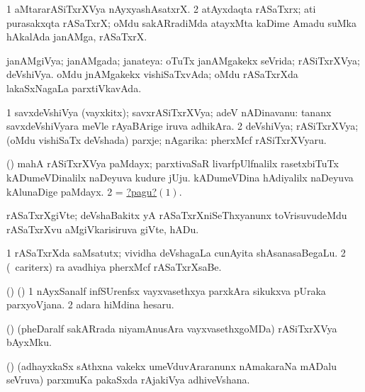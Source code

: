 \noindent
\gl{\pagu}
\bmng
\bnum
\num{1}  aMtararASiTxrXVya nAyxyashAsatxrX. 
\num{2}  atAyxdaqta rASaTxrx; ati purasakxqta rASaTxrX; oMdu sakARradiMda atayxMta kaDime Amadu suMka hAkalAda janAMga, rASaTxrX. 
\enum
\emng
\eentry

\bentry
{}
\gl{\gu}
\bmng
janAMgiVya; janAMgada; janateya: 
\banum
{} oTuTx janAMgakekx seVrida; rASiTxrXVya; deVshiVya. 
 oMdu jnAMgakekx vishiSaTxvAda; oMdu rASaTxrXda lakaSxNagaLa parxtiVkavAda. 
\eanum
\emng
\eentry

\bentry
{}
\gl{\nA}
\bmng
\bnum
\num{1} savxdeVshiVya (vayxkitx); savxrASiTxrXVya; adeV nADinavanu:  tananx savxdeVshiVyara meVle rAyaBArige iruva adhikAra. 
\num{2} deVshiVya; rASiTxrXVya; (oMdu vishiSaTx deVshada) parxje; nAgarika:  pherxMcf rASiTxrXVyaru. 
\enum
\emng

\noindent
\gl{\pagu}
\bmng
\hypertarget{national2pagu1}{} 
\bnum
{}  (\birx) 
\banum
{} mahA rASiTxrXVya paMdayx; parxtivaSaR livarfpUlfnalilx rasetxbiTuTx kADumeVDinalilx naDeyuva kudure jUju. 
 kADumeVDina hAdiyalilx naDeyuva kAlunaDige paMdayx. 
\eanum
\numie
\num{2}  = \hyperlink{national2pagu1}{?pagu?\((1)\)}. 
\enum
\emng
\eentry

\bentry
{}
\gl{\nA}
\bmng
rASaTxrXgiVte; deVshaBakitx yA rASaTxrXniSeThxyanunx toVrisuvudeMdu rASaTxrXvu aMgiVkarisiruva giVte, hADu. 
\emng
\eentry

\bentry
{}
\gl{\nA}
\bmng
\bnum
\num{1} rASaTxrXda saMsatutx; vividha deVshagaLa cunAyita shAsanasaBegaLu. 
\num{2} (\kanmu\ cariterx) ra avadhiya pherxMcf rASaTxrXsaBe. 
\enum
\emng
\eentry

\bentry
{}
\gl{\nA}
\bmng
(\ca) (\birx) 
\bnum
\num{1} nAyxSanalf infSUrenfsx vayxvasethxya parxkAra sikukxva pUraka parxyoVjana. 
\num{2} adara hiMdina hesaru. 
\enum
\emng
\eentry

\bentry
{}
\gl{\nA}
\bmng
(\ame) (pheDaralf sakARrada niyamAnusAra vayxvasethxgoMDa) rASiTxrXVya bAyxMku. 
\emng
\eentry

\bentry
{}
\gl{\nA}
\bmng
(\ame) (adhayxkaSx sAthxna \mo vakekx umeVduvAraranunx nAmakaraNa mADalu seVruva) parxmuKa pakaSxda rAjakiVya adhiveVshana. 
\emng
\eentry

